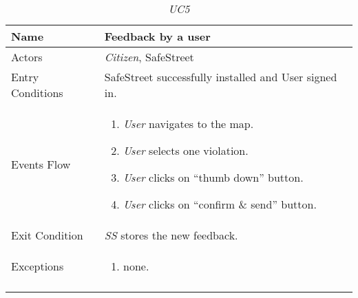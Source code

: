 \documentclass[../../../RASD.tex]{subfiles}
\begin{document}
    \begin{center}
        \begin{longtable}{| p{.35\linewidth} | p{.65\linewidth} |}
            \hline
            \textbf{Name} & \textbf{Feedback by a user}\\ \hline
            Actors & \textit{Citizen}, SafeStreet\\ \hline
            Entry Conditions & SafeStreet successfully installed and User signed in.\\ \hline
            Events Flow &
            \begin{enumerate}
                \item \textit{User} navigates to the map.
                \item \textit{User} selects one violation.
                \item \textit{User} clicks on “thumb down” button.
                \item \textit{User} clicks on “confirm \& send” button.
            \end{enumerate}
            \\ \hline
            Exit Condition & \textit{SS} stores the new feedback.\\ \hline
            Exceptions &
            \begin{enumerate}
                \item none.
            \end{enumerate}
            \\
            \hline
            \caption[\textit{Use Case 5}]{\textit{UC5}}
        \end{longtable}
    \end{center}
    \newpage
\end{document}
